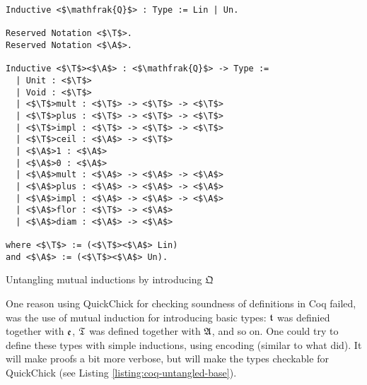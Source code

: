\begin{listing}[t]
\begin{verbatim}
Inductive <$\mathfrak{Q}$> : Type := Lin | Un.

Reserved Notation <$\T$>.
Reserved Notation <$\A$>.

Inductive <$\T$><$\A$> : <$\mathfrak{Q}$> -> Type :=
  | Unit : <$\T$>
  | Void : <$\T$>
  | <$\T$>mult : <$\T$> -> <$\T$> -> <$\T$>
  | <$\T$>plus : <$\T$> -> <$\T$> -> <$\T$>
  | <$\T$>impl : <$\T$> -> <$\T$> -> <$\T$>
  | <$\T$>ceil : <$\A$> -> <$\T$>
  | <$\A$>1 : <$\A$>
  | <$\A$>0 : <$\A$>
  | <$\A$>mult : <$\A$> -> <$\A$> -> <$\A$>
  | <$\A$>plus : <$\A$> -> <$\A$> -> <$\A$>
  | <$\A$>impl : <$\A$> -> <$\A$> -> <$\A$>
  | <$\A$>flor : <$\T$> -> <$\A$>
  | <$\A$>diam : <$\A$> -> <$\A$>

where <$\T$> := (<$\T$><$\A$> Lin)
and <$\A$> := (<$\T$><$\A$> Un).
\end{verbatim}
\caption{Untangling mutual inductions by introducing $\mathfrak{Q}$}
\label{listing:coq-untangled-base}
\end{listing}

One reason using QuickChick for checking soundness of definitions in Coq failed, was the use of mutual induction for introducing basic types: $\mathfrak{t}$ was definied together with $\mathfrak{e}$, $\mathfrak{T}$ was defined together with $\mathfrak{A}$, and so on. One could try to define these types with simple inductions, using encoding (similar to what \cite{DavidWalker2004} did). It will make proofs a bit more verbose, but will make the types checkable for QuickChick (see Listing \ref{listing:coq-untangled-base}).